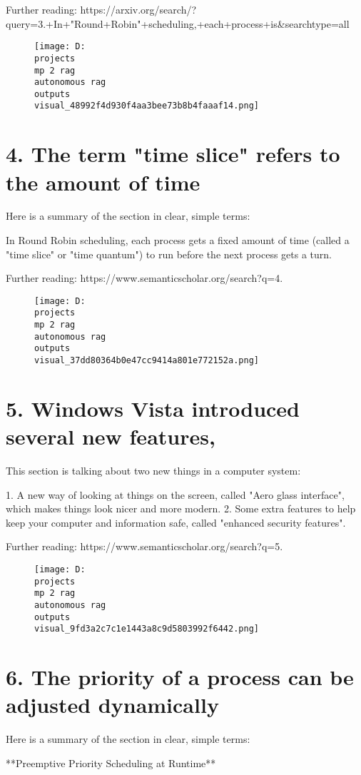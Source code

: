 \documentclass[12pt,a4paper]{article}
\begin{document}
Further reading: https://arxiv.org/search/?query=3.+In+"Round+Robin"+scheduling,+each+process+is&searchtype=all
\begin{figure}[h]
\centering
\texttt{[image: D:\\projects\\mp 2 rag\\autonomous rag\\outputs\\visual\_48992f4d930f4aa3bee73b8b4faaaf14.png]}
\end{figure}
\section{4. The term "time slice" refers to the amount of time}
Here is a summary of the section in clear, simple terms:

In Round Robin scheduling, each process gets a fixed amount of time (called a "time slice" or "time quantum") to run before the next process gets a turn.

Further reading: https://www.semanticscholar.org/search?q=4.%
\begin{figure}[h]
\centering
\texttt{[image: D:\\projects\\mp 2 rag\\autonomous rag\\outputs\\visual\_37dd80364b0e47cc9414a801e772152a.png]}
\end{figure}
\section{5. Windows Vista introduced several new features,}
This section is talking about two new things in a computer system:

1. A new way of looking at things on the screen, called "Aero glass interface", which makes things look nicer and more modern.
2. Some extra features to help keep your computer and information safe, called "enhanced security features".

Further reading: https://www.semanticscholar.org/search?q=5.%
\begin{figure}[h]
\centering
\texttt{[image: D:\\projects\\mp 2 rag\\autonomous rag\\outputs\\visual\_9fd3a2c7c1e1443a8c9d5803992f6442.png]}
\end{figure}
\section{6. The priority of a process can be adjusted dynamically}
Here is a summary of the section in clear, simple terms:

**Preemptive Priority Scheduling at Runtime**
\end{document}
